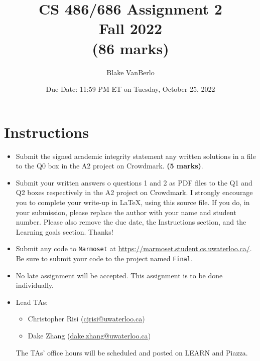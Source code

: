 \documentclass[12pt]{article}
\title{CS 486/686 Assignment 2 \\ Fall 2022 \\ (86 marks) }
\author{Blake VanBerlo}
\date{Due Date: 11:59 PM ET on Tuesday, October 25, 2022}
\begin{document}
\maketitle




\newpage
\section*{Instructions}

\begin{itemize}
\item
Submit the signed academic integrity statement any written solutions in a file to the Q0 box in the A2 project on Crowdmark. \textbf{(5 marks)}.

\item Submit your written answers o questions 1 and 2 as PDF files to the Q1 and Q2 boxes respectively in the A2 project on Crowdmark. I strongly encourage you to complete your write-up in LaTeX, using this source file. If you do, in your submission, please replace the author with your name and student number. Please also remove the due date, the Instructions section, and the Learning goals section. Thanks!

\item Submit any code to \verb+Marmoset+ at \url{https://marmoset.student.cs.uwaterloo.ca/}. Be sure to submit your code to the project named \texttt{Final}. 

\item
No late assignment will be accepted. This assignment is to be done individually.

\item
Lead TAs: 
\begin{itemize}
\item 
Christopher Risi (\url{cjrisi@uwaterloo.ca})
\item
Dake Zhang (\url{dake.zhang@uwaterloo.ca})
\end{itemize}
The TAs' office hours will be scheduled and posted on LEARN and Piazza.
\end{itemize}
\end{document}
